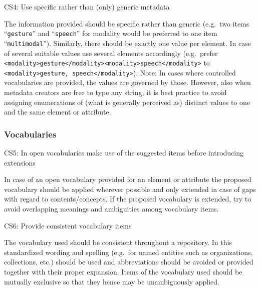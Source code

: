 CS4: Use specific rather than (only) generic metadata



The information provided should be specific rather than generic
(e.g.~two items ``\texttt{gesture}'' and ``\texttt{speech}'' for modality would be preferred to one item ``\texttt{multimodal}''). Similarly, there should be exactly one value per element. In case of several suitable values use several elements accordingly (e.g.~prefer
\texttt{\textless{}modality\textgreater{}gesture\textless{}/modality\textgreater{}\textless{}modality\textgreater{}speech\textless{}/modality\textgreater{}} to \texttt{\textless{}modality\textgreater{}gesture,\ speech\textless{}/modality\textgreater{}}). Note: In cases where controlled vocabularies are provided, the values are governed by those. However, also when metadata creators are free to type any string, it is best practice to avoid assigning enumerations of (what is generally perceived as) distinct values to one and the same element or attribute.

\subsubsection{Vocabularies}\label{vocabularies}

CS5: In open vocabularies make use of the suggested items before introducing extensions

 

In case of an open vocabulary provided for an element or attribute the proposed vocabulary should be applied wherever possible and only extended in case of gaps with regard to contents/concepts. If the proposed vocabulary is extended, try to avoid overlapping meanings and ambiguities among vocabulary items.


CS6: Provide consistent vocabulary items


The vocabulary used should be consistent throughout a repository. In this standardized wording and spelling (e.g.~for named entities such as organizations, collections, etc.) should be used and abbreviations should be avoided or provided together with their proper expansion. Items of the vocabulary used should be mutually exclusive so that they hence may be unambiguously applied.
